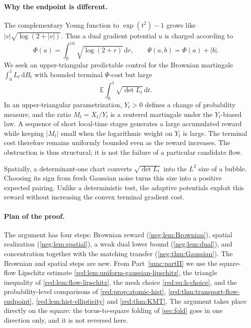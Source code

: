 \documentclass[11pt]{article}
\theoremstyle{definition}
\theoremstyle{remark}
\numberwithin{equation}{section}
\begin{document}
\paragraph{Why the endpoint is different.}
The complementary Young function to $\exp(t^2)-1$ grows like
$|v|\sqrt{\log(2+|v|)}$. Thus a dual gradient potential $u$ is charged
according to
\begin{equation}\label{neg:eq:PhiPsi}
 \Phi(a)=\int_0^{|a|}\sqrt{\log(2+r)}\,\mathrm dr,
 \qquad \Psi(a,b)=\Phi(a)+|b|.
\end{equation}
We seek an upper-triangular predictable control for the Brownian martingale
$\int_0^1L_t\,\mathrm dB_t$ with bounded terminal $\Psi$-cost but large
\begin{equation}\label{neg:eq:detreward}
   \mathbb E\int_0^1\sqrt{\det L_t}\,\mathrm dt.
\end{equation}
In an upper-triangular parametrization, $Y_t>0$ defines a change of
probability measure, and the ratio $M_t=X_t/Y_t$ is a centered
martingale under the $Y_t$-biased law. A sequence of short
local-time stages generates a large accumulated reward while keeping
$|M_t|$ small when the logarithmic weight on $Y_t$ is large. The
terminal cost therefore remains uniformly bounded even as the reward
increases. The obstruction is thus structural; it is not the failure
of a particular candidate flow.

Spatially, a determinant-one chart converts $\sqrt{\det L_t}$ into the
$L^2$ size of a bubble. Choosing its sign from fresh Gaussian noise
turns this size into a positive expected pairing. Unlike a deterministic
test, the adaptive potentials exploit this reward without increasing
the convex terminal gradient cost.

\paragraph{Plan of the proof.}
The argument has four steps: Brownian reward (\cref{neg:lem:Brownian}),
spatial realization (\cref{neg:lem:spatial}), a weak dual lower bound
(\cref{neg:lem:dual}), and concentration together with the matching
transfer (\cref{neg:thm:Gaussian}). The Brownian and spatial steps are
new. From Part~\ref{umc:partII} we use the square-flow Lipschitz
estimate \cref{red:lem:uniform-gaussian-lipschitz}, the triangle
inequality of \cref{red:lem:flow-lipschitz}, the mesh choice
\eqref{red:eq:h-choice}, and the probability-level comparisons of \cref{red:prop:atomic-hist},
\cref{red:thm:transport-flow-endpoint}, \cref{red:lem:hist-ellipticity}
and \cref{red:thm:KMT}.
The argument takes place directly on the square: the torus-to-square
folding of \cref{sec:fold} goes in one direction only, and it is not
reversed here.
\end{document}
